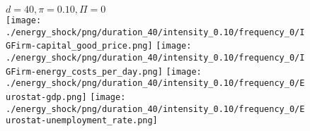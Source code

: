 \begin{figure}[ht!]
\centering\leavevmode
\begin{minipage}{17cm}
\centering\leavevmode
{$d=40, \pi=0.10, \Pi=0$}\\
\texttt{[image: ./energy\_shock/png/duration\_40/intensity\_0.10/frequency\_0/IGFirm-capital\_good\_price.png]}
\texttt{[image: ./energy\_shock/png/duration\_40/intensity\_0.10/frequency\_0/IGFirm-energy\_costs\_per\_day.png]}
\texttt{[image: ./energy\_shock/png/duration\_40/intensity\_0.10/frequency\_0/Eurostat-gdp.png]}
\texttt{[image: ./energy\_shock/png/duration\_40/intensity\_0.10/frequency\_0/Eurostat-unemployment\_rate.png]}
\end{minipage}
\end{figure}

